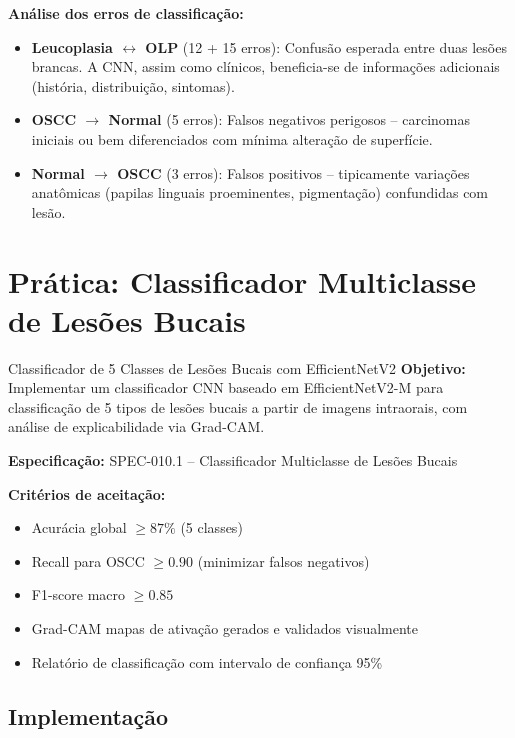 \textbf{Análise dos erros de classificação:}
\begin{itemize}
  \item \textbf{Leucoplasia $\leftrightarrow$ OLP} (12 + 15 erros): Confusão
        esperada entre duas lesões brancas. A CNN, assim como clínicos, beneficia-se
        de informações adicionais (história, distribuição, sintomas).
  \item \textbf{OSCC $\rightarrow$ Normal} (5 erros): Falsos negativos perigosos
        -- carcinomas iniciais ou bem diferenciados com mínima alteração de superfície.
  \item \textbf{Normal $\rightarrow$ OSCC} (3 erros): Falsos positivos -- tipicamente
        variações anatômicas (papilas linguais proeminentes, pigmentação) confundidas
        com lesão.
\end{itemize}

\section{Prática: Classificador Multiclasse de Lesões Bucais}
\label{sec:pratica-lesoes}

\niveltres

\begin{pratica}{Classificador de 5 Classes de Lesões Bucais com EfficientNetV2}
  \textbf{Objetivo:} Implementar um classificador CNN baseado em EfficientNetV2-M
  para classificação de 5 tipos de lesões bucais a partir de imagens intraorais,
  com análise de explicabilidade via Grad-CAM.

  \textbf{Especificação:} SPEC-010.1 -- Classificador Multiclasse de Lesões Bucais

  \textbf{Critérios de aceitação:}
  \begin{itemize}
    \item Acurácia global $\geq 87\%$ (5 classes)
    \item Recall para OSCC $\geq 0.90$ (minimizar falsos negativos)
    \item F1-score macro $\geq 0.85$
    \item Grad-CAM mapas de ativação gerados e validados visualmente
    \item Relatório de classificação com intervalo de confiança 95\%
  \end{itemize}
\end{pratica}

\subsection{Implementação}

